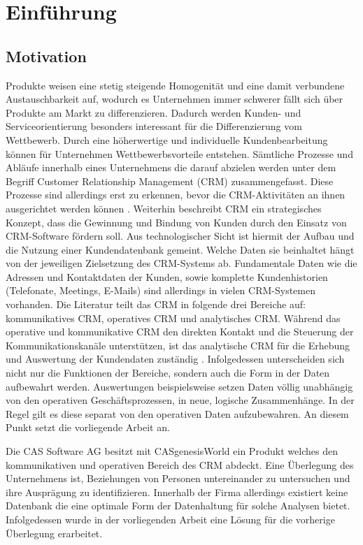 \chapter{Einführung}
\label{ch:Einfuehrung}

\section{Motivation}
\label{ch:Einfuehrung:sec:Motivation}

Produkte weisen eine stetig steigende Homogenität und eine damit verbundene Austauschbarkeit auf, wodurch es Unternehmen immer schwerer fällt sich über Produkte am Markt zu differenzieren. Dadurch werden Kunden- und Serviceorientierung besonders interessant für die Differenzierung vom Wettbewerb. Durch eine höherwertige und individuelle Kundenbearbeitung können für Unternehmen Wettbewerbsvorteile entstehen. Sämtliche Prozesse und Abläufe innerhalb eines Unternehmens die darauf abzielen werden unter dem Begriff Customer Relationship Management (CRM) zusammengefasst. Diese Prozesse sind allerdings erst zu erkennen, bevor die CRM-Aktivitäten an ihnen ausgerichtet werden können \cite{SWB-1001}. Weiterhin beschreibt CRM ein strategisches Konzept, dass die Gewinnung und Bindung von Kunden durch den Einsatz von CRM-Software fördern soll. Aus technologischer Sicht ist hiermit der Aufbau und die Nutzung einer Kundendatenbank gemeint. Welche Daten sie beinhaltet hängt von der jeweiligen Zielsetzung des CRM-Systems ab. Fundamentale Daten wie die Adressen und Kontaktdaten der Kunden, sowie komplette Kundenhistorien (Telefonate, Meetings, E-Mails) sind allerdings in vielen CRM-Systemen vorhanden. Die Literatur teilt das CRM in folgende drei Bereiche auf: kommunikatives CRM, operatives CRM und analytisches CRM. Während das operative und kommunikative CRM den direkten Kontakt und die Steuerung der Kommunikationskanäle unterstützen, ist das analytische CRM für die Erhebung und Auswertung der Kundendaten zuständig \cite{SWB-375372644}. Infolgedessen unterscheiden sich nicht nur die Funktionen der Bereiche, sondern auch die Form in der Daten aufbewahrt werden. Auswertungen beispielsweise setzen Daten völlig unabhängig von den operativen Geschäftsprozessen, in neue, logische Zusammenhänge. In der Regel gilt es diese separat von den operativen Daten aufzubewahren. An diesem Punkt setzt die vorliegende Arbeit an. 

Die CAS Software AG besitzt mit CASgenesisWorld ein Produkt welches den kommunikativen und operativen Bereich des CRM abdeckt. Eine Überlegung des Unternehmens ist, Beziehungen von Personen untereinander zu untersuchen und ihre Ausprägung zu identifizieren. Innerhalb der Firma allerdings existiert keine Datenbank die eine optimale Form der Datenhaltung für solche Analysen bietet. Infolgedessen wurde in der vorliegenden Arbeit eine Lösung für die vorherige Überlegung erarbeitet.



